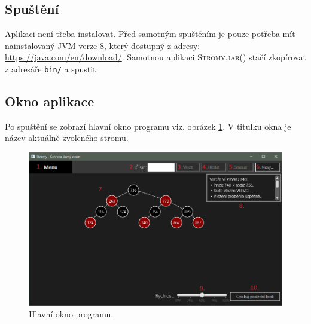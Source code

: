 \documentclass[
  biblatex=false,
  font=serif,
  glossaries=false,
  tables=false,
  theorems=false,
  index
]{kidiplom}
\begin{document}
\subsection{Spuštění}
\indent \indent Aplikaci není třeba instalovat. Před samotným spuštěním je pouze potřeba mít nainstalovaný JVM verze 8, který dostupný z adresy: \url{https://java.com/en/download/}. Samotnou aplikaci \textsc{Stromy.jar()} stačí zkopírovat z adresáře \texttt{bin/} a spustit.

\subsection{Okno aplikace}
\indent \indent Po spuštění se zobrazí hlavní okno programu viz. obrázek \ref{hlavniOkno}. V titulku okna je název aktuálně zvoleného stromu.

\begin{figure}[h!]
\centering
	\includegraphics[scale=0.5]{obrazky/34Program.png}
	\caption{Hlavní okno programu.}
	\label{hlavniOkno}
\end{figure}

\newpage
\end{document}
